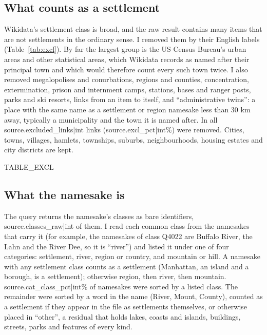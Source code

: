 \documentclass[11pt,a4paper]{article}
\begin{document}
\subsection{What counts as a settlement}
Wikidata's settlement class is broad, and the raw result contains many items that are not settlements in the ordinary sense. I removed them by their English labels (Table~\ref{tab:excl}). By far the largest group is the US Census Bureau's urban areas and other statistical areas, which Wikidata records as named after their principal town and which would therefore count every such town twice. I also removed megalopolises and conurbations, regions and counties, concentration, extermination, prison and internment camps, stations, bases and ranger posts, parks and ski resorts, links from an item to itself, and ``administrative twins'': a place with the same name as a settlement or region namesake less than 30 km away, typically a municipality and the town it is named after. In all {{source.excluded_links|int}} links ({{source.excl_pct|int}}\%) were removed. Cities, towns, villages, hamlets, townships, suburbs, neighbourhoods, housing estates and city districts are kept.

{{TABLE_EXCL}}

\subsection{What the namesake is}
The query returns the namesake's classes as bare identifiers, {{source.classes_raw|int}} of them. I read each common class from the namesakes that carry it (for example, the namesakes of class Q4022 are Buffalo River, the Lahn and the River Dee, so it is ``river'') and listed it under one of four categories: settlement, river, region or country, and mountain or hill. A namesake with any settlement class counts as a settlement (Manhattan, an island and a borough, is a settlement); otherwise region, then river, then mountain. {{source.cat_class_pct|int}}\% of namesakes were sorted by a listed class. The remainder were sorted by a word in the name (River, Mount, County), counted as a settlement if they appear in the file as settlements themselves, or otherwise placed in ``other'', a residual that holds lakes, coasts and islands, buildings, streets, parks and features of every kind.
\end{document}
